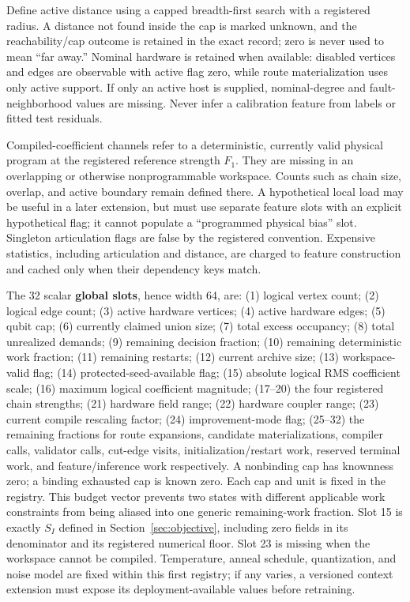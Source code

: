 Define active distance using a capped breadth-first search with a registered radius. A distance not found inside the cap is marked unknown, and the reachability/cap outcome is retained in the exact record; zero is never used to mean ``far away.'' Nominal hardware is retained when available: disabled vertices and edges are observable with active flag zero, while route materialization uses only active support. If only an active host is supplied, nominal-degree and fault-neighborhood values are missing. Never infer a calibration feature from labels or fitted test residuals.

Compiled-coefficient channels refer to a deterministic, currently valid physical program at the registered reference strength \(F_1\). They are missing in an overlapping or otherwise nonprogrammable workspace. Counts such as chain size, overlap, and active boundary remain defined there. A hypothetical local load may be useful in a later extension, but must use separate feature slots with an explicit hypothetical flag; it cannot populate a ``programmed physical bias'' slot. Singleton articulation flags are false by the registered convention. Expensive statistics, including articulation and distance, are charged to feature construction and cached only when their dependency keys match.

The 32 scalar \textbf{global slots}, hence width 64, are: (1) logical vertex count; (2) logical edge count; (3) active hardware vertices; (4) active hardware edges; (5) qubit cap; (6) currently claimed union size; (7) total excess occupancy; (8) total unrealized demands; (9) remaining decision fraction; (10) remaining deterministic work fraction; (11) remaining restarts; (12) current archive size; (13) workspace-valid flag; (14) protected-seed-available flag; (15) absolute logical RMS coefficient scale; (16) maximum logical coefficient magnitude; (17--20) the four registered chain strengths; (21) hardware field range; (22) hardware coupler range; (23) current compile rescaling factor; (24) improvement-mode flag; (25--32) the remaining fractions for route expansions, candidate materializations, compiler calls, validator calls, cut-edge visits, initialization/restart work, reserved terminal work, and feature/inference work respectively. A nonbinding cap has knownness zero; a binding exhausted cap is known zero. Each cap and unit is fixed in the registry. This budget vector prevents two states with different applicable work constraints from being aliased into one generic remaining-work fraction. Slot 15 is exactly $S_I$ defined in Section~\ref{sec:objective}, including zero fields in its denominator and its registered numerical floor. Slot 23 is missing when the workspace cannot be compiled. Temperature, anneal schedule, quantization, and noise model are fixed within this first registry; if any varies, a versioned context extension must expose its deployment-available values before retraining.


